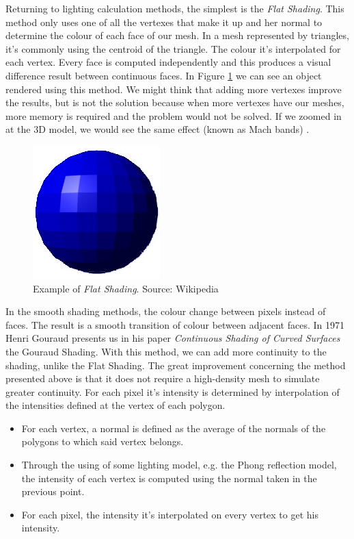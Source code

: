 \documentclass[titlepage,12pt]{report}
\begin{document}
Returning to lighting calculation methods, the simplest is the \textit{Flat Shading}. This method only uses one of all the vertexes that make it up and her normal to determine the colour of each face of our mesh. In a mesh represented by triangles, it's commonly using the centroid of the triangle. The colour it's interpolated for each vertex. Every face is computed independently and this produces a visual difference result between continuous faces. In Figure \ref{flat:shading} we can see an object rendered using this method. We might think that adding more vertexes improve the results, but is not the solution because when more vertexes have our meshes, more memory is required and the problem would not be solved. If we zoomed in at the 3D model, we would see the same effect (known as Mach bands) \citep[pp.~5245--5250]{Lotto1999}.

\begin{figure}[H]
	\centering
	\includegraphics[scale=0.5]{media/Flat-shading-sample.png}
	\caption{Example of \textit{Flat Shading}. Source: Wikipedia}
	\label{flat:shading}
\end{figure}

In the smooth shading methods, the colour change between pixels instead of faces. The result is a smooth transition of colour between adjacent faces.
In 1971 Henri Gouraud presents us in his paper \textit{Continuous Shading of Curved Surfaces} \citep[pp.~623--629]{Henri1971} the Gouraud Shading. With this method, we can add more continuity to the shading, unlike the Flat Shading. The great improvement concerning the method presented above is that it does not require a high-density mesh to simulate greater continuity. For each pixel it's intensity is determined by interpolation of the intensities defined at the vertex of each polygon.

\begin{itemize}
	\item For each vertex, a normal is defined as the average of the normals of the polygons to which said vertex belongs.
	\item Through the using of some lighting model,  e.g. the Phong reflection model, the intensity of each vertex is computed using the normal taken in the previous point.
	\item For each pixel, the intensity it's interpolated on every vertex to get his intensity.
\end{itemize} 
\end{document}
